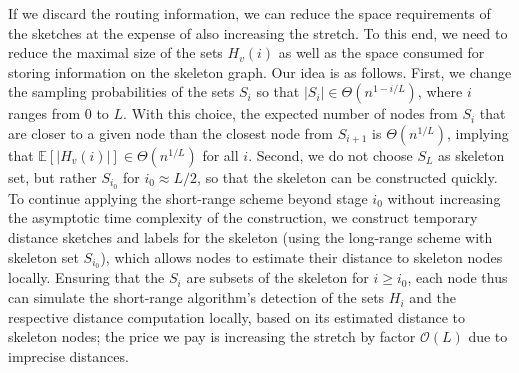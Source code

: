 \documentclass[letterpaper,11pt]{article}
\newcommand{\BO}{\mathcal{O}}
\begin{document}
If we discard the routing information, we can reduce the space requirements of
the sketches at the expense of also increasing the stretch. To this end, we need
to reduce the maximal size of the sets $H_v(i)$ as well as the space consumed
for storing information on the skeleton graph. Our idea is as follows.
First, we change the sampling probabilities of the sets $S_i$ so that $|S_i|\in
\Theta(n^{1-i/L})$, where $i$ ranges from $0$ to $L$. With this choice, the
expected number of nodes from $S_i$ that are closer to a given node than the
closest node from $S_{i+1}$ is $\Theta(n^{1/L})$, implying that
$\mathbb{E}[|H_v(i)|]\in \Theta(n^{1/L})$ for all $i$. Second, we do not choose
$S_L$ as skeleton set, but rather $S_{i_0}$ for $i_0\approx L/2$, so that the
skeleton can be constructed quickly. To continue applying the short-range scheme
beyond stage $i_0$ without increasing the asymptotic time complexity of the
construction, we construct temporary distance sketches and labels for the
skeleton (using the long-range scheme with skeleton set $S_{i_0}$), which
allows nodes to estimate their distance to skeleton nodes locally. Ensuring that
the $S_i$ are subsets of the skeleton for $i\geq i_0$, each node thus can
simulate the short-range algorithm's detection of the sets $H_i$ and the
respective distance computation locally, based on its estimated distance to
skeleton nodes; the price we pay is increasing the stretch by factor $\BO(L)$
due to imprecise distances.
\end{document}
